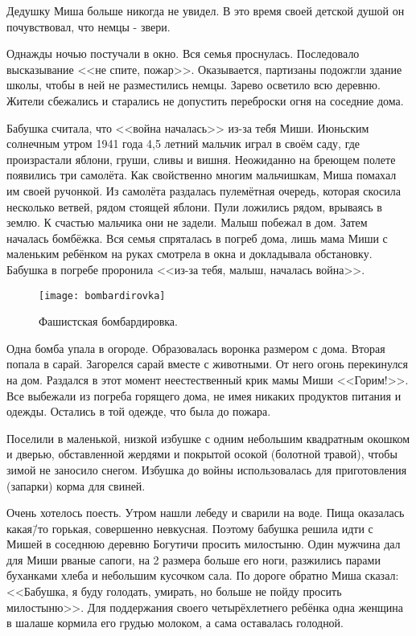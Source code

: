 Дедушку Миша больше никогда не увидел. В это время своей детской душой он почувствовал, что немцы - звери.

Однажды ночью постучали в окно. Вся семья проснулась. Последовало высказывание <<не спите, пожар>>. Оказывается, партизаны подожгли здание школы, чтобы в ней не разместились немцы. Зарево осветило всю деревню. Жители сбежались и старались не допустить переброски огня на соседние дома.

Бабушка считала, что <<война началась>> из-за тебя Миши. Июньским солнечным утром 1941 года 4,5 летний мальчик играл в своём саду, где произрастали яблони, груши, сливы и вишня. Неожиданно на бреющем полете появились три самолёта. Как свойственно многим мальчишкам, Миша помахал им своей ручонкой. Из самолёта раздалась пулемётная очередь, которая скосила несколько ветвей, рядом стоящей яблони. Пули ложились рядом, врываясь в землю. К счастью мальчика они не задели. Малыш побежал в дом. Затем началась бомбёжка. Вся семья спряталась в погреб дома, лишь мама Миши с маленьким ребёнком на руках смотрела в окна и докладывала обстановку. Бабушка в погребе проронила <<из-за тебя, малыш, началась война>>.

\begin{wrapfigure}{O}{.4\textwidth}
\centering
\texttt{[image: bombardirovka]}
\caption{Фашистская бомбардировка.}
\label{fig:bombardirovka}
\end{wrapfigure}

Одна бомба упала в огороде. Образовалась воронка размером с дома. Вторая попала в сарай. Загорелся сарай вместе с животными. От него огонь перекинулся на дом. Раздался в этот момент неестественный крик мамы Миши <<Горим!>>. Все выбежали из погреба горящего дома, не имея никаких продуктов питания и одежды. Остались в той одежде, что была до пожара.

Поселили в маленькой, низкой избушке с одним небольшим квадратным окошком и дверью, обставленной жердями и покрытой осокой (болотной травой), чтобы зимой не заносило снегом. Избушка до войны использовалась для приготовления (запарки) корма для свиней.

Очень хотелось поесть. Утром нашли лебеду и сварили на воде. Пища оказалась какая\=/то горькая, совершенно невкусная. Поэтому бабушка решила идти с Мишей в соседнюю деревню Богутичи просить милостыню. Один мужчина дал для Миши рваные сапоги, на 2 размера больше его ноги, разжились парами буханками хлеба и небольшим кусочком сала. По дороге обратно Миша сказал: <<Бабушка, я буду голодать, умирать, но больше не пойду просить милостыню>>. Для поддержания своего четырёхлетнего ребёнка одна женщина в шалаше кормила его грудью молоком, а сама оставалась голодной.

